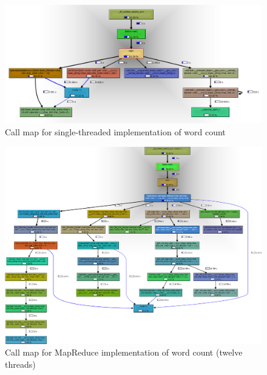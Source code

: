 \documentclass[12pt, letterpaper]{article}
\begin{document}
\newpage
	\begin{figure}[h]
	\centering
	\includegraphics[width=1.35\textwidth, angle=90]{call-graph-part3-cropped}
	\caption{Call map for single-threaded implementation of word count}
	\end{figure}
\newpage
	\begin{figure}[h]
	\centering
	\includegraphics[width=1.35\textwidth, angle=90]{call-graph-part4-cropped}
	\caption{Call map for MapReduce implementation of word count (twelve threads)}
	\end{figure}
\end{document}
